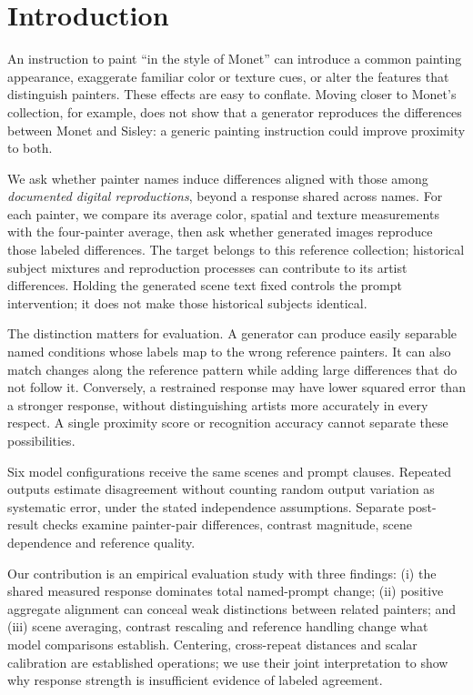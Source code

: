 \section{Introduction}
An instruction to paint ``in the style of Monet'' can introduce a common
painting appearance, exaggerate familiar color or texture cues, or alter the
features that distinguish painters. These effects are easy to
conflate. Moving closer to Monet's collection, for example, does not show that
a generator reproduces the differences between Monet and Sisley: a generic
painting instruction could improve proximity to both.

We ask whether painter names induce differences aligned with those among
\emph{documented digital reproductions}, beyond a response shared across names.
For each painter, we compare its average color, spatial and texture measurements
with the four-painter average, then ask whether generated images reproduce
those labeled differences. The target belongs to this reference collection;
historical subject
mixtures and reproduction processes can contribute to its artist differences.
Holding the generated scene text fixed controls the prompt intervention; it
does not make those historical subjects identical.

The distinction matters for evaluation. A generator can produce easily
separable named conditions whose labels map to the wrong reference painters.
It can also match changes along the reference pattern while adding large
differences that do not follow it. Conversely, a restrained response may have lower squared
error than a stronger response, without distinguishing artists more accurately
in every respect. A single proximity score or recognition accuracy cannot
separate these possibilities.

Six model configurations receive the same scenes and prompt clauses.
Repeated outputs estimate
disagreement without counting random output variation as systematic error, under
the stated independence assumptions. Separate post-result checks examine
painter-pair differences, contrast magnitude, scene dependence and reference quality.

Our contribution is an empirical evaluation study with three findings: (i) the
shared measured response dominates total named-prompt change; (ii) positive
aggregate alignment can conceal weak distinctions between related painters;
and (iii) scene averaging, contrast rescaling and reference handling change what
model comparisons establish. Centering, cross-repeat distances and scalar
calibration are established operations; we use their joint interpretation to
show why response strength is insufficient evidence of labeled agreement.


